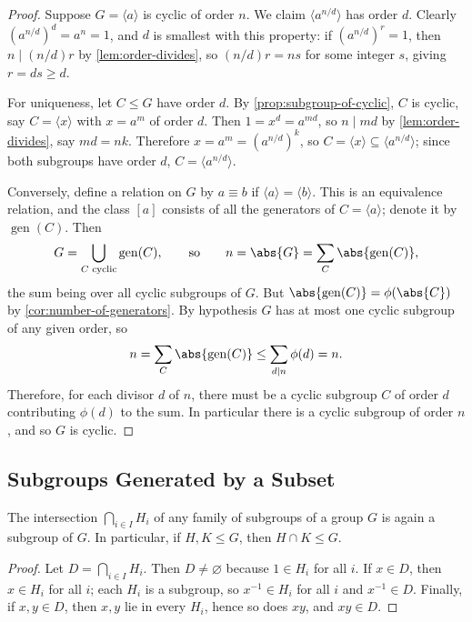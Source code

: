\begin{proof}
	Suppose \(G = \langle a\rangle\) is cyclic of order \(n\). We claim
	\(\langle a^{n/d}\rangle\) has order \(d\). Clearly \((a^{n/d})^d = a^n = 1\), and
	\(d\) is smallest with this property: if \((a^{n/d})^r = 1\), then
	\(n \mid (n/d)r\) by \autoref{lem:order-divides}, so \((n/d)r = ns\) for some
	integer \(s\), giving \(r = ds \geq d\).

	For uniqueness, let \(C \leq G\) have order \(d\). By
	\autoref{prop:subgroup-of-cyclic}, \(C\) is cyclic, say
	\(C = \langle x\rangle\) with \(x = a^m\) of order \(d\). Then
	\(1 = x^d = a^{md}\), so \(n \mid md\) by \autoref{lem:order-divides}, say
	\(md = nk\). Therefore \(x = a^m = (a^{n/d})^k\), so
	\(C = \langle x\rangle \subseteq \langle a^{n/d}\rangle\); since both subgroups have
	order \(d\), \(C = \langle a^{n/d}\rangle\).

	Conversely, define a relation on \(G\) by \(a \equiv b\) if
	\(\langle a\rangle = \langle b\rangle\). This is an equivalence relation, and the class
	\([a]\) consists of all the generators of \(C = \langle a\rangle\); denote it by
	\(\operatorname{gen}(C)\). Then
	\[
		G = \bigcup_{C \text{ cyclic}} \operatorname{gen}(C),
		\qquad\text{so}\qquad
		n = \abs{G} = \sum_{C} \abs{\operatorname{gen}(C)},
	\]
	the sum being over all cyclic subgroups of \(G\). But
	\(\abs{\operatorname{gen}(C)} = \phi(\abs{C})\) by
	\autoref{cor:number-of-generators}. By hypothesis \(G\) has at most one cyclic
	subgroup of any given order, so
	\[
		n = \sum_C \abs{\operatorname{gen}(C)} \leq \sum_{d \mid n} \phi(d) = n.
	\]
	Therefore, for each divisor \(d\) of \(n\), there must be a cyclic subgroup \(C\) of
	order \(d\) contributing \(\phi(d)\) to the sum. In particular there is a cyclic
	subgroup of order \(n\), and so \(G\) is cyclic.
\end{proof}

\subsection{Subgroups Generated by a Subset}

\begin{proposition}\label{prop:intersection-subgroup}
	The intersection \(\bigcap_{i \in I} H_i\) of any family of subgroups of a group \(G\) is
	again a subgroup of \(G\). In particular, if \(H, K \leq G\), then \(H \cap K \leq G\).
\end{proposition}

\begin{proof}
	Let \(D = \bigcap_{i\in I} H_i\). Then \(D \neq \varnothing\) because \(1 \in H_i\) for
	all \(i\). If \(x \in D\), then \(x \in H_i\) for all \(i\); each \(H_i\) is a subgroup,
	so \(x^{-1} \in H_i\) for all \(i\) and \(x^{-1} \in D\). Finally, if \(x, y \in D\),
	then \(x, y\) lie in every \(H_i\), hence so does \(xy\), and \(xy \in D\).
\end{proof}

